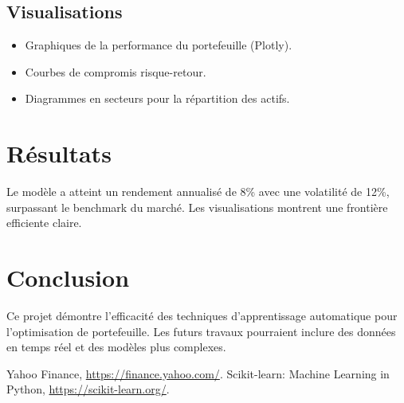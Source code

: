 \documentclass[a4paper,12pt]{article}
\begin{document}
\subsection{Visualisations}
\begin{itemize}
    \item Graphiques de la performance du portefeuille (Plotly).
    \item Courbes de compromis risque-retour.
    \item Diagrammes en secteurs pour la répartition des actifs.
\end{itemize}

\section{Résultats}
Le modèle a atteint un rendement annualisé de 8\% avec une volatilité de 12\%, surpassant le benchmark du marché. Les visualisations montrent une frontière efficiente claire.

\section{Conclusion}
Ce projet démontre l'efficacité des techniques d'apprentissage automatique pour l'optimisation de portefeuille. Les futurs travaux pourraient inclure des données en temps réel et des modèles plus complexes.

\begin{thebibliography}{9}
Yahoo Finance, \url{https://finance.yahoo.com/}.
Scikit-learn: Machine Learning in Python, \url{https://scikit-learn.org/}.
\end{thebibliography}
\end{document}
